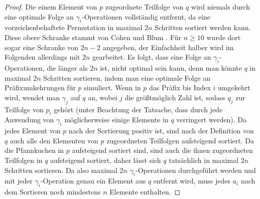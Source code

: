 \documentclass[a4paper, 11pt, ngerman]{article}
\begin{document}
\begin{proof}
    Die einem Element von $p$ zugeordnete Teilfolge von $q$ wird niemals durch eine optimale Folge an $\gamma_i$-Operationen vollständig entfernt, da eine vorzeichenbehaftete Permutation in maximal $2n$ Schritten sortiert werden kann. Diese obere Schranke stammt von Cohen und Blum \cite{burntpancakes}. Für $n \ge 10$ wurde dort sogar eine Schranke von $2n - 2$ angegeben, der Einfachheit halber wird im Folgenden allerdings mit $2n$ gearbeitet. Es folgt, dass eine Folge an $\gamma_i$-Operationen, die länger als $2n$ ist, nicht optimal sein kann, denn man könnte $q$ in maximal $2n$ Schritten sortieren, indem man eine optimale Folge an Präfixumkehrungen für $p$ simuliert. Wenn in $p$ das Präfix bis Index $i$ umgekehrt wird, wendet man $\gamma_j$ auf $q$ an, wobei $j$ die größtmöglich Zahl ist, sodass $q_j$ zur Teilfolge von $p_i$ gehört (unter Beachtung der Tatsache, dass durch jede Anwendung von $\gamma_i$ möglicherweise einige Elemente in $q$ verringert werden). Da jedes Element von $p$ nach der Sortierung positiv ist, sind nach der Definition von $q$ auch alle den Elementen von $p$ zugeordneten Teilfolgen aufsteigend sortiert. Da die Pfannkuchen in $p$ aufsteigend sortiert sind, sind auch die ihnen zugeordneten Teilfolgen in $q$ aufsteigend sortiert, daher lässt sich $q$ tatsächlich in maximal $2n$ Schritten sortieren. Da also maximal $2n$ $\gamma_i$-Operationen durchgeführt werden und mit jeder $\gamma_i$-Operation genau ein Element aus $q$ entfernt wird, muss jedes $a_i$ nach dem Sortieren noch mindestens $n$ Elemente enthalten.


\end{proof}
\end{document}
